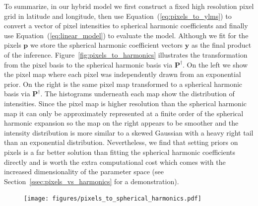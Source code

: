 \documentclass[linenumbers,modern]{aastex62}
\begin{document}
To summarize, in our hybrid model we first construct a fixed high resolution pixel grid in latitude and longitude, then use Equation~(\ref{eq:pixels_to_ylms}) to convert a vector of pixel intensities to spherical harmonic coefficients and finally use Equation~(\ref{eq:linear_model}) to evaluate the model.
Although we fit for the pixels $\mathbf{p}$ we store the spherical harmonic coefficient vectors $\mathbf{y}$ as the final product of the inference. 
Figure~\ref{fig:pixels_to_harmonics} illustrates the transformation from the pixel basis to the spherical harmonic basis via $\mathbf{P}^\dagger$.
On the left we show the pixel map where each pixel was independently drawn from an exponential prior. 
On the right is the same pixel map transformed to a spherical harmonic basis via $\mathbf{P}^\dagger$. 
The histograms underneath each map show the distribution of intensities.
Since the pixel map is higher resolution than the spherical harmonic map it can only be approximately represented at a finite order of the spherical harmonic expansion so the map on the right appears to be smoother and the intensity distribution is more similar to a skewed Gaussian with a heavy right tail than an exponential distribution.
Nevertheless, we find that setting priors on pixels is a far better solution than fitting the spherical harmonic coefficients directly and is worth the extra computational cost which comes with the increased dimensionality of the parameter space (see Section~\ref{ssec:pixels_vs_harmonics} for a demonstration).

\begin{figure}[t!]
    \begin{centering}
    \texttt{[image: figures/pixels\_to\_spherical\_harmonics.pdf]}
    \end{centering}
\end{figure}
\end{document}
